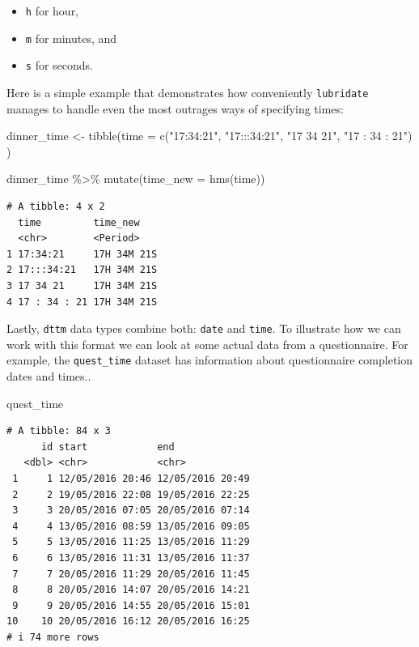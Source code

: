 \documentclass[
  letterpaper,
]{krantz}
\makeatletter
\newenvironment{Shaded}{\begin{snugshade}}{\end{snugshade}}
\newcommand{\AttributeTok}[1]{\textcolor[rgb]{0.40,0.45,0.13}{#1}}
\newcommand{\FunctionTok}[1]{\textcolor[rgb]{0.28,0.35,0.67}{#1}}
\newcommand{\NormalTok}[1]{\textcolor[rgb]{0.00,0.23,0.31}{#1}}
\newcommand{\OtherTok}[1]{\textcolor[rgb]{0.00,0.23,0.31}{#1}}
\newcommand{\SpecialCharTok}[1]{\textcolor[rgb]{0.37,0.37,0.37}{#1}}
\newcommand{\StringTok}[1]{\textcolor[rgb]{0.13,0.47,0.30}{#1}}
\newenvironment{kframe}{%
\medskip{}
\setlength{\fboxsep}{.8em}
 \def\at@end@of@kframe{}%
 \ifinner\ifhmode%
  \def\at@end@of@kframe{\end{minipage}}%
  \begin{minipage}{\columnwidth}%
 \fi\fi%
 \def\FrameCommand##1{\hskip\@totalleftmargin \hskip-\fboxsep
 \colorbox{shadecolor}{##1}\hskip-\fboxsep
     \hskip-\linewidth \hskip-\@totalleftmargin \hskip\columnwidth}%
 \MakeFramed {\advance\hsize-\width
   \@totalleftmargin\z@ \linewidth\hsize
   \@setminipage}}%
 {\par\unskip\endMakeFramed%
 \at@end@of@kframe}
\renewenvironment{Shaded}{\begin{kframe}}{\end{kframe}}
\makeatother
\begin{document}
\begin{itemize}
\item
  \texttt{h} for hour,
\item
  \texttt{m} for minutes, and
\item
  \texttt{s} for seconds.
\end{itemize}

Here is a simple example that demonstrates how conveniently
\texttt{lubridate} manages to handle even the most outrages ways of
specifying times:

\begin{Shaded}
\begin{Highlighting}[]
\NormalTok{dinner\_time }\OtherTok{\textless{}{-}} \FunctionTok{tibble}\NormalTok{(}\AttributeTok{time =} \FunctionTok{c}\NormalTok{(}\StringTok{"17:34:21"}\NormalTok{,}
                               \StringTok{"17:::34:21"}\NormalTok{,}
                               \StringTok{"17 34 21"}\NormalTok{,}
                               \StringTok{"17 : 34 : 21"}\NormalTok{)}
\NormalTok{                      )}

\NormalTok{dinner\_time }\SpecialCharTok{\%\textgreater{}\%} \FunctionTok{mutate}\NormalTok{(}\AttributeTok{time\_new =} \FunctionTok{hms}\NormalTok{(time))}
\end{Highlighting}
\end{Shaded}

\begin{verbatim}
# A tibble: 4 x 2
  time         time_new   
  <chr>        <Period>   
1 17:34:21     17H 34M 21S
2 17:::34:21   17H 34M 21S
3 17 34 21     17H 34M 21S
4 17 : 34 : 21 17H 34M 21S
\end{verbatim}

Lastly, \texttt{dttm} data types combine both: \texttt{date} and
\texttt{time}. To illustrate how we can work with this format we can
look at some actual data from a questionnaire. For example, the
\texttt{\textasciigrave{}quest\_time\textasciigrave{}} dataset has
information about questionnaire completion dates and times..

\begin{Shaded}
\begin{Highlighting}[]
\NormalTok{quest\_time}
\end{Highlighting}
\end{Shaded}

\begin{verbatim}
# A tibble: 84 x 3
      id start            end             
   <dbl> <chr>            <chr>           
 1     1 12/05/2016 20:46 12/05/2016 20:49
 2     2 19/05/2016 22:08 19/05/2016 22:25
 3     3 20/05/2016 07:05 20/05/2016 07:14
 4     4 13/05/2016 08:59 13/05/2016 09:05
 5     5 13/05/2016 11:25 13/05/2016 11:29
 6     6 13/05/2016 11:31 13/05/2016 11:37
 7     7 20/05/2016 11:29 20/05/2016 11:45
 8     8 20/05/2016 14:07 20/05/2016 14:21
 9     9 20/05/2016 14:55 20/05/2016 15:01
10    10 20/05/2016 16:12 20/05/2016 16:25
# i 74 more rows
\end{verbatim}
\end{document}

